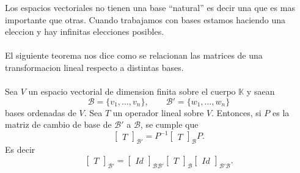 \documentclass{article}
\theoremstyle{definition}
\theoremstyle{definition}
\theoremstyle{remark}
\begin{document}
Los espacios vectoriales no tienen una base ``natural'' es decir una que es mas importante que otras. Cuando trabajamos con bases estamos haciendo una eleccion y hay infinitas elecciones posibles.\\\\ El siguiente teorema nos dice como se relacionan las matrices de una transformacion lineal respecto a distintas bases. \\\\ Sea $V$ un espacio vectorial de dimension finita sobre el cuerpo $\mathbb{K}$ y saean \[
  \mathcal{B}=\{v_1, \dots ,v_n\}, \quad \quad \mathcal{B'}=\{w_1, \dots ,w_n\}
  \]bases ordenadas de $V$. Sea $T$ un operador lineal sobre $V$. Entonces, si $P$ es la matriz de cambio de base de $\mathcal{B'}$ a $\mathcal{B}$, se cumple que \[
  \begin{bmatrix}T\end{bmatrix}_{\mathcal{B}'}=P^{-1}\begin{bmatrix}T\end{bmatrix}_{\mathcal{B}}P.
\]
Es decir \[
  \begin{bmatrix}T\end{bmatrix}_{\mathcal{B'}}=\begin{bmatrix}Id\end{bmatrix}_{\mathcal{B}\mathcal{B'}}\begin{bmatrix}T\end{bmatrix}_{\mathcal{B}}\begin{bmatrix}Id\end{bmatrix}_{\mathcal{B'}\mathcal{B}}.
\] \; 
\end{document}
